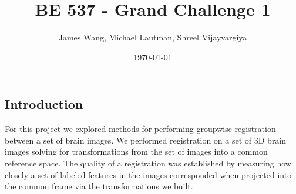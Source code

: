 \documentclass{article}
\begin{document}
    

	\begin{par}
	
		\title{BE 537 - Grand Challenge 1}		
		\date{\today}
		\author{James Wang, Michael Lautman, Shreel Vijayvargiya}
		\maketitle
	
	\end{par}

	\begin{par}
		\section*{Introduction}
		For this project we explored methods for performing groupwise registration between a set of brain images. We performed registration on a set of 3D brain images solving for transformations from the set of images into a common reference space. The quality of a registration was established by measuring how closely a set of labeled features in the images corresponded when projected into the common frame via the transformations we built.
	\end{par}
	
\end{document}

